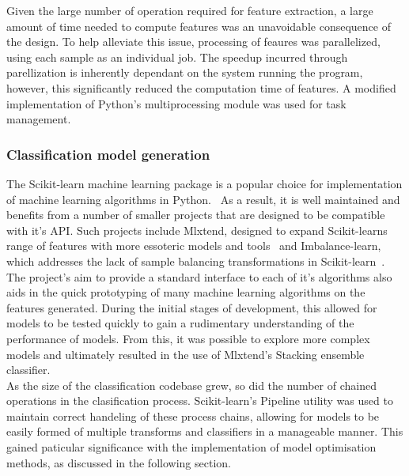 \documentclass[titlepage, 12pt]{scrartcl} \usepackage{enumitem}
\begin{document}
Given the large number of operation required for feature extraction, a large
amount of time needed to compute features was an unavoidable consequence of
the design. To help alleviate this issue, processing of feaures was
parallelized, using each sample as an individual job. The speedup incurred
through parellization is inherently dependant on the system running the
program, however, this significantly reduced the computation time of features.
A modified implementation of Python's multiprocessing module was used for task
management.

\subsubsection{Classification model generation}\label{Sklearn}
The Scikit-learn machine learning package is a popular choice for
implementation of machine learning algorithms in
Python.~\parencite{Pedregosa2011} As a result, it is well maintained and
benefits from a number of smaller projects that are designed to be compatible
with it's API. Such projects include Mlxtend, designed to expand Scikit-learns
range of features with more essoteric models and tools~\parencite{Raschka2016,}
and Imbalance-learn, which addresses the lack of sample balancing
transformations in Scikit-learn~\parencite{Lemaitre2017}. The project's aim to
provide a standard interface to each of it's algorithms also aids in the quick
prototyping of many machine learning algorithms on the features generated.
During the initial stages of development, this allowed for models to be tested
quickly to gain a rudimentary understanding of the performance of models. From
this, it was possible to explore more complex models and ultimately resulted in
the use of Mlxtend's Stacking ensemble classifier.\\

As the size of the classification codebase grew, so did the number of chained
operations in the clasification process. Scikit-learn's Pipeline utility was
used to maintain correct handeling of these process chains, allowing for models
to be easily formed of multiple transforms and classifiers in a manageable
manner. This gained paticular significance with the implementation of model
optimisation methods, as discussed in the following section.
\end{document}
